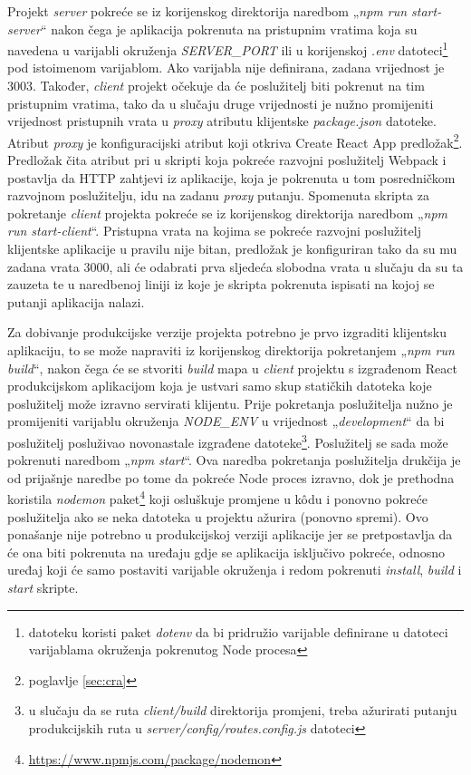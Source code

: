 \documentclass[times, utf8, diplomski, numeric]{fer}
\begin{document}
Projekt \emph{server} pokreće se iz korijenskog direktorija naredbom „\emph{npm run start-server}“ nakon čega je aplikacija pokrenuta na pristupnim vratima  koja su navedena u varijabli okruženja  \emph{SERVER\_PORT} ili u korijenskoj \emph{.env} datoteci\footnote{
    datoteku koristi paket \emph{dotenv} da bi pridružio varijable definirane u datoteci varijablama okruženja pokrenutog Node procesa
} pod istoimenom varijablom.
Ako varijabla nije definirana, zadana vrijednost je 3003.
Također, \emph{client} projekt očekuje da će poslužitelj biti pokrenut na tim pristupnim vratima, tako da u slučaju druge vrijednosti je nužno promijeniti vrijednost pristupnih vrata u \emph{proxy} atributu klijentske \emph{package.json} datoteke.
Atribut \emph{proxy} je konfiguracijski atribut koji otkriva Create React App predložak\footnote{poglavlje \ref{sec:cra}}.
Predložak čita atribut pri u skripti koja pokreće razvojni poslužitelj  Webpack i postavlja da HTTP zahtjevi iz aplikacije, koja je pokrenuta u tom posredničkom  razvojnom poslužitelju, idu na zadanu \emph{proxy} putanju.
Spomenuta skripta za pokretanje \emph{client} projekta pokreće se iz korijenskog direktorija naredbom „\emph{npm run start-client}“.
Pristupna vrata na kojima se pokreće razvojni poslužitelj klijentske aplikacije u pravilu nije bitan, predložak je konfiguriran tako da su mu zadana vrata 3000, ali će odabrati prva sljedeća slobodna vrata u slučaju da su ta zauzeta te u naredbenoj liniji iz koje je skripta pokrenuta ispisati na kojoj se putanji aplikacija nalazi.

Za dobivanje produkcijske verzije projekta potrebno je prvo izgraditi  klijentsku aplikaciju, to se može napraviti iz korijenskog direktorija pokretanjem „\emph{npm run build}“, nakon čega će se stvoriti \emph{build} mapa u \emph{client} projektu s izgrađenom React produkcijskom aplikacijom koja je ustvari samo skup statičkih datoteka koje poslužitelj može izravno servirati klijentu.
Prije pokretanja poslužitelja nužno je promijeniti varijablu okruženja \emph{NODE\_ENV} u vrijednost „\emph{development}“ da bi poslužitelj posluživao novonastale izgrađene datoteke\footnote{
    u slučaju da se ruta \emph{client/build} direktorija promjeni, treba ažurirati putanju produkcijskih ruta u \emph{server/config/routes.config.js} datoteci
}.
Poslužitelj se sada može pokrenuti naredbom „\emph{npm start}“.
Ova naredba pokretanja poslužitelja drukčija je od prijašnje naredbe po tome da pokreće Node proces izravno, dok je prethodna koristila \emph{nodemon} paket\footnote{\url{https://www.npmjs.com/package/nodemon}} koji osluškuje promjene u kôdu i ponovno pokreće poslužitelja ako se neka datoteka u projektu ažurira (ponovno spremi).
Ovo ponašanje nije potrebno u produkcijskoj verziji aplikacije jer se pretpostavlja da će ona biti pokrenuta na uređaju gdje se aplikacija isključivo pokreće, odnosno uređaj koji će samo postaviti varijable okruženja i redom pokrenuti \emph{install}, \emph{build} i \emph{start} skripte.
\end{document}
